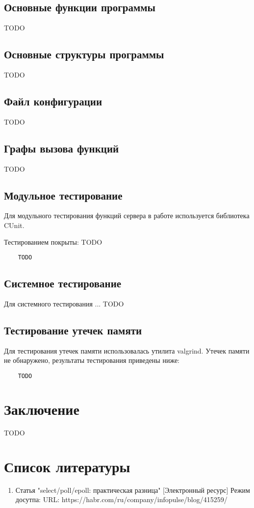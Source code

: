 \documentclass[a4paper,12pt]{report}
\begin{document}
\section{Основные функции программы}
TODO

\section{Основные структуры программы}
TODO

\section{Файл конфигурации}
TODO

\section{Графы вызова функций}
TODO

\section{Модульное тестирование}

Для модульного тестирования функций сервера в работе используется библиотека CUnit.

Тестированием покрыты: TODO
\begin{verbatim}
    TODO
\end{verbatim}


\section{Системное тестирование}

Для системного тестирования ...
TODO

\section{Тестирование утечек памяти}

Для тестирования утечек памяти использовалась утилита valgrind. Утечек памяти не обнаружено, результаты тестирования приведены ниже: 
\begin{verbatim}
    TODO
\end{verbatim}

\clearpage
\chapter*{Заключение}

TODO

\newpage
\chapter*{Список литературы}

\begin{enumerate}
	\item Статья "select/poll/epoll: практическая разница" [Электронный ресурс] Режим досутпа: URL: https://habr.com/ru/company/infopulse/blog/415259/
	
\end{enumerate}
\end{document}

